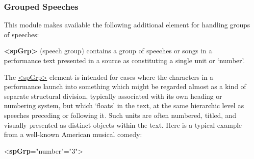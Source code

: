 \subsubsection[{Grouped Speeches}]{Grouped Speeches}\label{DRSPG}\par
This module makes available the following additional element for handling groups of speeches: 
\begin{sansreflist}
  
\item [\textbf{<spGrp>}] (speech group) contains a group of speeches or songs in a performance text presented in a source as constituting a single unit or ‘number’.
\end{sansreflist}
\par
The \hyperref[TEI.spGrp]{<spGrp>} element is intended for cases where the characters in a performance launch into something which might be regarded almost as a kind of separate structural division, typically associated with its own heading or numbering system, but which ‘floats’ in the text, at the same hierarchic level as speeches preceding or following it. Such units are often numbered, titled, and visually presented as distinct objects within the text. Here is a typical example from a well-known American musical comedy: \par\bgroup{}\exampleFont \begin{shaded}\noindent\mbox{}{<\textbf{spGrp}\hspace*{1em}{type}="{number}"\hspace*{1em}{n}="{3}">}\mbox{}\newline 

\end{shaded}
